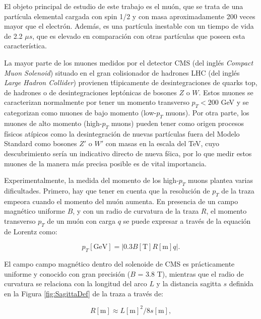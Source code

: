 
El objeto principal de estudio de este trabajo es el mu\'on, que se trata de una part\'icula elemental cargada con spin 1/2 y con masa aproximadamente 200 veces mayor que el electr\'on. Adem\'as, es una part\'icula inestable con un tiempo de vida de 2.2 $\mu s$, que es elevado en comparaci\'on con otras part\'iculas que poseen esta caracter\'istica.

La mayor parte de los muones medidos por el detector CMS (del ingl\'es \textit{Compact Muon Solenoid}) situado en el gran colisionador de hadrones LHC (del ingl\'es \textit{Large Hadron Collider}) provienen t\'tipicamente de desintegraciones de quarks top, de hadrones o de desintegraciones lept\'onicas de bosones $Z$ o $W$. Estos muones se caracterizan normalmente por tener un momento transverso $p_{T} < 200$ GeV y se categorizan como muones de bajo momento (low-$p_{T}$ muons). Por otra parte, los muones de alto momento (high-$p_{T}$ muons) pueden tener como origen procesos f\'isicos at\'ipicos como la desintegraci\'on de nuevas part\'iculas fuera del Modelo Standard como bosones $Z'$ o $W'$ con masas en la escala del TeV, cuyo descubrimiento ser\'ia un indicativo directo de nueva f\'sica, por lo que medir estos muones de la manera m\'as precisa posible es de vital importancia.

Experimentalmente, la medida del momento de los high-$p_{T}$ muons plantea varias dificultades. Primero, hay que tener en cuenta que la resoluci\'on de $p_{T}$ de la traza empeora cuando el momento del mu\'on aumenta.
En presencia de un campo magn\'etico uniforme $B$, y con un radio de curvatura de la traza $R$, el momento transverso $p_{T}$ de un mu\'on con carga $q$ se puede expresar a trav\'es de la equaci\'on de Lorentz como:

\begin{equation}
  p_{T}[\text{GeV}] = \left|0.3 B[\text{T}] R[\text{m}] q\right|.
\label{eq:pTvsRadius}
\end{equation}

El campo campo magn\'etico dentro del solenoide de CMS es pr\'acticamente uniforme y conocido con gran precisi\'on ($B$ = 3.8 T), mientras que el radio de curvatura se relaciona con la longitud del arco $L$ y la distancia sagitta $s$ definida en la Figura \ref{fig:SagittaDef} de la traza a trav\'es de:

\begin{equation}
  R[\text{m}]\approx L[\text{m}]^{2}/8s[\text{m}],
\label{eq:RadiusvsSagitta}
\end{equation}

